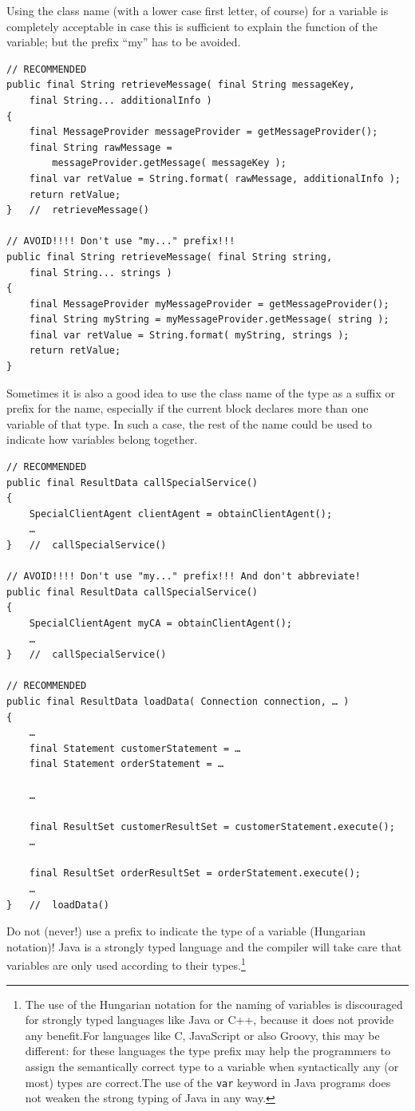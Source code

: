 \documentclass[11pt,a4paper, titlepage, parskip=half, headsepline, footsepline, cleardoublepage=current, headheight=1cm]{scrbook}
\begin{document}
Using the class name (with a lower case first letter, of course) for a variable is completely acceptable in case this is sufficient to explain the function of the variable; but the prefix “my” has to be avoided.
\begin{lstlisting}
// RECOMMENDED
public final String retrieveMessage( final String messageKey, 
    final String... additionalInfo )
{
    final MessageProvider messageProvider = getMessageProvider();
    final String rawMessage = 
        messageProvider.getMessage( messageKey );
    final var retValue = String.format( rawMessage, additionalInfo );
    return retValue;
}   //  retrieveMessage()

// AVOID!!!! Don't use "my..." prefix!!!
public final String retrieveMessage( final String string, 
    final String... strings )
{
    final MessageProvider myMessageProvider = getMessageProvider();
    final String myString = myMessageProvider.getMessage( string );
    final var retValue = String.format( myString, strings );
    return retValue;
}
\end{lstlisting}

Sometimes it is also a good idea to use the class name of the type as a suffix or prefix for the name, especially if the current block declares more than one variable of that type. In such a case, the rest of the name could be used to indicate how variables belong together.
\begin{lstlisting}
// RECOMMENDED
public final ResultData callSpecialService()
{
    SpecialClientAgent clientAgent = obtainClientAgent();
    …
}   //  callSpecialService()

// AVOID!!!! Don't use "my..." prefix!!! And don't abbreviate!
public final ResultData callSpecialService()
{
    SpecialClientAgent myCA = obtainClientAgent();
    …
}   //  callSpecialService()

// RECOMMENDED
public final ResultData loadData( Connection connection, … )
{
    …
    final Statement customerStatement = …
    final Statement orderStatement = …

    …

    final ResultSet customerResultSet = customerStatement.execute();
    …

    final ResultSet orderResultSet = orderStatement.execute();
    …
}   //  loadData()
\end{lstlisting}

Do not (never!) use a prefix to indicate the type of a variable (Hungarian notation)! Java is a strongly typed language and the compiler will take care that variables are only used according to their types.\footnote{The use of the Hungarian notation for the naming of variables is discouraged for strongly typed languages like Java or C++, because it does not provide any benefit.\newline For languages like C, JavaScript or also Groovy, this may be different: for these languages the type prefix may help the programmers to assign the semantically correct type to a variable when syntactically any (or most) types are correct.\newline The use of the \lstinline|var| keyword in Java programs does not weaken the strong typing of Java in any way.}
\end{document}

